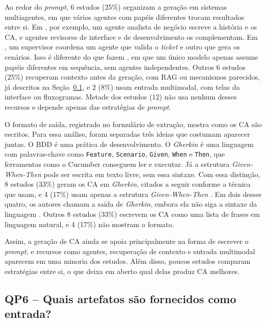 Ao redor do \textit{prompt}, 6 estudos (25\%) organizam a geração em sistemas multiagentes, em que vários agentes com papéis diferentes trocam resultados entre si. Em , por exemplo, um agente analista de negócio escreve a história e os CA, e agentes revisores de interface e de desenvolvimento os complementam. Em , um supervisor coordena um agente que valida o \textit{ticket} e outro que gera os cenários. Isso é diferente do que fazem , em que um único modelo apenas assume papéis diferentes em sequência, sem agentes independentes. Outros 6 estudos (25\%) recuperam contexto antes da geração, com RAG ou mecanismos parecidos, já descritos na Seção~\ref{sec:qp6}, e 2 (8\%) usam entrada multimodal, com telas da interface ou fluxogramas. Metade dos estudos (12) não usa nenhum desses recursos e depende apenas das estratégias de \textit{prompt}.

O formato de saída, registrado no formulário de extração, mostra como os CA são escritos. Para essa análise, foram separadas três ideias que costumam aparecer juntas. O BDD é uma prática de desenvolvimento. O \textit{Gherkin} é uma linguagem com palavras-chave como \texttt{Feature}, \texttt{Scenario}, \texttt{Given}, \texttt{When} e \texttt{Then}, que ferramentas como o Cucumber conseguem ler e executar. Já a estrutura \textit{Given-When-Then} pode ser escrita em texto livre, sem essa sintaxe. Com essa distinção, 8 estudos (33\%) geram os CA em \textit{Gherkin}, citados a seguir conforme a técnica que usam, e 4 (17\%) usam apenas a estrutura \textit{Given-When-Then} \cite{baker2026,wang2025,avasiloaie2025,khelifa2026}. Em dois desses quatro, os autores chamam a saída de \textit{Gherkin}, embora ela não siga a sintaxe da linguagem \cite{wang2025,avasiloaie2025}. Outros 8 estudos (33\%) escrevem os CA como uma lista de frases em linguagem natural, e 4 (17\%) não mostram o formato.

Assim, a geração de CA ainda se apoia principalmente na forma de escrever o \textit{prompt}, e recursos como agentes, recuperação de contexto e entrada multimodal aparecem em uma minoria dos estudos. Além disso, poucos estudos comparam estratégias entre si, o que deixa em aberto qual delas produz CA melhores.

\subsection{QP6 -- Quais artefatos são fornecidos como entrada?}
\label{sec:qp6}


